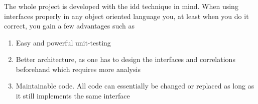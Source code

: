 \documentclass{article}
\begin{document}
\subsubsection{}
The whole project is developed with the \gls{idd} technique\cite{url:considerations:interface-drive-development-1}\cite{url:considerations:interface-drive-development-2} in mind. When using interfaces properly in any object oriented language you, at least when you do it correct, you gain a few advantages such as
\begin{enumerate}
    \item Easy and powerful unit-testing
    \item Better architecture, as one has to design the interfaces and correlations beforehand which requires more analysis
    \item Maintainable code. All code can essentially be changed or replaced as long as it still implements the same interface
\end{enumerate}
\end{document}
